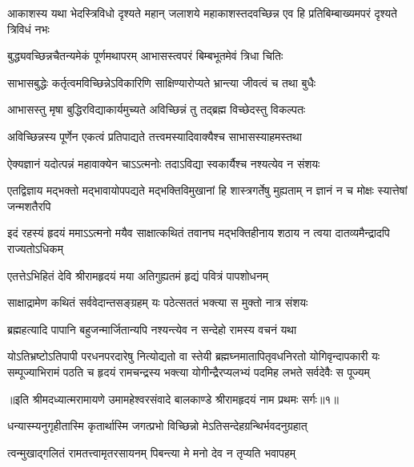\threelineshloka
{आकाशस्य यथा भेदस्त्रिविधो दृश्यते महान्}
{जलाशये महाकाशस्तदवच्छिन्न एव हि}
{प्रतिबिम्बाख्यमपरं दृश्यते त्रिविधं नभः} %

\twolineshloka
{बुद्ध्यवच्छिन्नचैतन्यमेकं पूर्णमथापरम्}
{आभासस्त्वपरं बिम्बभूतमेवं त्रिधा चितिः} %

\twolineshloka
{साभासबुद्धेः कर्तृत्वमविच्छिन्नेऽविकारिणि}
{साक्षिण्यारोप्यते भ्रान्त्या जीवत्वं च तथा बुधैः} %

\twolineshloka
{आभासस्तु मृषा बुद्धिरविद्याकार्यमुच्यते}
{अविच्छिन्नं तु तद्ब्रह्म विच्छेदस्तु विकल्पतः} %

\twolineshloka
{अविच्छिन्नस्य पूर्णेन एकत्वं प्रतिपाद्यते}
{तत्त्वमस्यादिवाक्यैश्च साभासस्याहमस्तथा} %

\twolineshloka
{ऐक्यज्ञानं यदोत्पन्नं महावाक्येन चाऽऽत्मनोः}
{तदाऽविद्या स्वकार्यैश्च नश्यत्येव न संशयः} %

\threelineshloka
{एतद्विज्ञाय मद्भक्तो मद्भावायोपपद्यते}
{मद्भक्तिविमुखानां हि शास्त्रगर्तेषु मुह्यताम्}
{न ज्ञानं न च मोक्षः स्यात्तेषां जन्मशतैरपि} %

\fourlineindentedshloka
{इदं रहस्यं हृदयं ममाऽऽत्मनो}
{मयैव साक्षात्कथितं तवानघ}
{मद्भक्तिहीनाय शठाय न त्वया}
{दातव्यमैन्द्रादपि राज्यतोऽधिकम्} %


\twolineshloka
{एतत्तेऽभिहितं देवि श्रीरामहृदयं मया}
{अतिगुह्यतमं हृद्यं पवित्रं पापशोधनम्} %

\twolineshloka
{साक्षाद्रामेण कथितं सर्ववेदान्तसङ्ग्रहम्}
{यः पठेत्सततं भक्त्या स मुक्तो नात्र संशयः} %

\twolineshloka
{ब्रह्महत्यादि पापानि बहुजन्मार्जितान्यपि}
{नश्यन्त्येव न सन्देहो रामस्य वचनं यथा} %

\fourlineindentedshloka
{योऽतिभ्रष्टोऽतिपापी परधनपरदारेषु नित्योद्यतो वा}
{स्तेयी ब्रह्मघ्नमातापितृवधनिरतो योगिवृन्दापकारी}
{यः सम्पूज्याभिरामं पठति च हृदयं रामचन्द्रस्य भक्त्या}
{योगीन्द्रैरप्यलभ्यं पदमिह लभते सर्वदेवैः स पूज्यम्} %

{॥इति श्रीमदध्यात्मरामायणे उमामहेश्वरसंवादे बालकाण्डे
श्रीरामहृदयं नाम प्रथमः सर्गः॥१॥
}





\twolineshloka
{धन्यास्म्यनुगृहीतास्मि कृतार्थास्मि जगत्प्रभो}
{विच्छिन्नो मेऽतिसन्देहग्रन्थिर्भवदनुग्रहात्} %

\twolineshloka
{त्वन्मुखाद्गलितं रामतत्त्वामृतरसायनम्}
{पिबन्त्या मे मनो देव न तृप्यति भवापहम्} %

